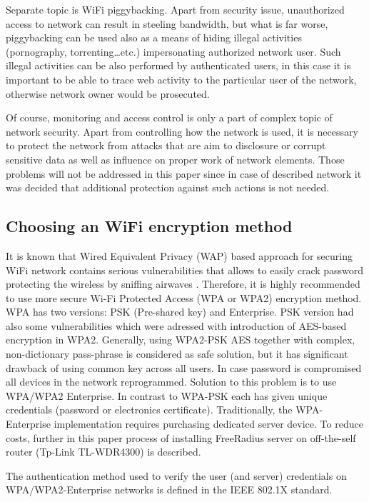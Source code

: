 \documentclass{llncs}
\begin{document}
Separate topic is WiFi piggybacking. Apart from security issue,
unauthorized access to network can result in steeling bandwidth, but what is far
worse, piggybacking can be used also as a means of hiding illegal activities
(pornography, torrenting\ldots etc.) impersonating authorized network user. Such
illegal activities can be also performed by authenticated users, in this case it is
important to be able to trace web activity to the particular user of the
network, otherwise network owner would be prosecuted. 

Of course, monitoring and access control is only a part of complex topic of
network security. Apart from controlling how the network is used, it is
necessary to protect the network from attacks that are aim to disclosure or corrupt
sensitive data as well as influence on proper work of network elements.
Those problems will not be addressed in this paper since in case of described
network it was decided that additional protection against such actions is not
needed.

\subsection{Choosing an WiFi encryption method}
It is known that Wired Equivalent Privacy (WAP) based approach for
securing WiFi network contains serious vulnerabilities that allows to
easily crack password protecting the wireless by sniffing airwaves
\cite{WebDeadAgain}.
Therefore, it is highly recommended to use more secure Wi-Fi Protected Access
(WPA or WPA2) encryption method. WPA has two versions: PSK
(Pre-shared key) and Enterprise. PSK version had also some
vulnerabilities \cite{WpaPskVulnerabilities} which were adressed with
introduction of AES-based encryption in WPA2. Generally, using WPA2-PSK AES
together with complex, non-dictionary pass-phrase is considered as safe solution, but it has
significant drawback of using common key across all users.
In case password is compromised all devices in the
network reprogrammed. Solution to this problem is to use WPA/WPA2 Enterprise. In
contrast to WPA-PSK each has given unique credentials (password or electronics
certificate). Traditionally, the WPA-Enterprise implementation requires
purchasing dedicated server device. To reduce costs, further in this paper
process of installing FreeRadius server on off-the-self router (Tp-Link
TL-WDR4300) is described.

The authentication method used to verify the user (and server) credentials on
WPA/WPA2-Enterprise networks is defined in the IEEE 802.1X standard.
\end{document}
